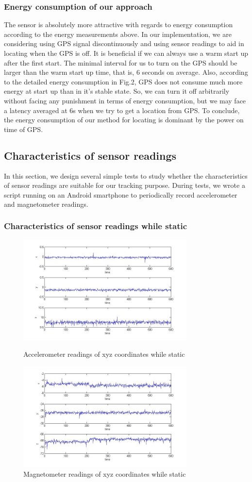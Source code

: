 \documentclass[journal]{IEEEtran}
\begin{document}
\subsubsection{Energy consumption of our approach} 
The sensor is absolutely more attractive with regards to energy consumption according to the energy measurements above. 
In our implementation, we are considering using GPS signal discontinuously and using sensor readings to aid in locating when the GPS is off. 
It is beneficial if we can always use a warm start up after the first start. The minimal interval for us to turn on the GPS should be larger than the warm start up time, that is, 6 seconds on average.
Also, according to the detailed energy consumption in Fig.2, GPS does not consume much more energy at start up than in it's stable state. 
So, we can turn it off arbitrarily without facing any punishment in terms of energy consumption, but we may face a latency averaged at 6s when we try to get a location from GPS.
To conclude, the energy consumption of our method for locating is dominant by the power on time of GPS.

\subsection{Characteristics of sensor readings}
In this section, we design several simple tests to study whether the characteristics of sensor readings are suitable for our tracking purpose.
During tests, we wrote a script running on an Android smartphone to periodically record accelerometer and magnetometer readings. 

\subsubsection{Characteristics of sensor readings while static}
\begin{figure}
	\centering
	\includegraphics[width=3.5in]{figures/acc-stay}
	\caption{Accelerometer readings of xyz coordinates while static}
	\includegraphics[width=3.5in]{figures/mag-stay}
	\caption{Magnetometer readings of xyz coordinates while static}
\end{figure}
\end{document}
